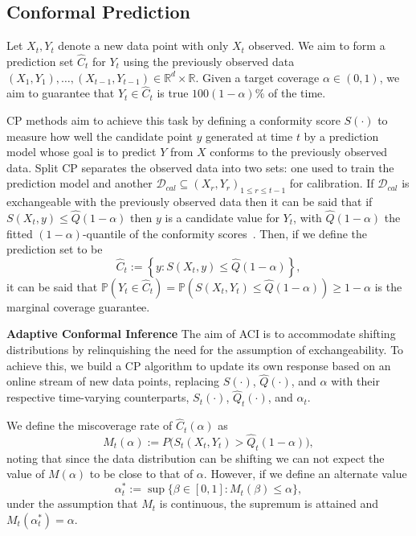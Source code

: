 \subsection{Conformal Prediction}
Let \(X_{t}, Y_{t}\) denote a new data point with only \(X_{t}\) observed. We aim to form a prediction set \(\hat{C}_t\) for \(Y_t\) using the previously observed data \(
(X_1, Y_1), \ldots, (X_{t-1}, Y_{t-1}) \in \mathbb{R}^d \times \mathbb{R}
\). Given a target coverage \(\alpha \in (0,1)\), we aim to guarantee that \(Y_t \in \hat{C}_t\) is true \(100(1-\alpha)\%\) of the time. 

CP methods aim to achieve this task by defining a conformity score \(S(\cdot)\) to measure how well the candidate point \(y\) generated at time \(t\) by a prediction model whose goal is to predict \(Y\) from \(X\) conforms to the previously observed data.
Split CP separates the observed data into two sets: one used to train the prediction model and another \(\mathcal{D}_{cal} \subseteq {(X_r,Y_r)}_{1 \le r \le t-1}\) for calibration. If \(\mathcal{D}_{cal}\) is exchangeable with the previously observed data then it can be said that if \(S(X_t,y) \le \hat{Q}(1-\alpha)\) then \(y\) is a candidate value for \(Y_t\), with \(\hat{Q}(1-\alpha)\) the fitted \((1-\alpha)\)-quantile of the conformity scores~\cite{gibbs2024conformal}.
Then, if we define the prediction set to be 
\[\hat{C}_{t}:=\left\{y:S(X_t,y)\leq \hat{Q}(1-\alpha)\right\},\]
it can be said that
\(
\mathbb{P}(Y_t \in \hat{C}_t) = \mathbb{P}(S(X_t, Y_t) \le \hat{Q}(1-\alpha)) \geq 1-\alpha
\) is the marginal coverage guarantee.

\textbf{Adaptive Conformal Inference} The aim of ACI is to accommodate shifting distributions by relinquishing the need for the assumption of exchangeability. To achieve this, we build a CP algorithm to update its own response based on an online stream of new data points, replacing \(S(\cdot)\), \(\hat{Q}(\cdot)\), and \(\alpha\) with their respective time-varying  counterparts, \(S_t(\cdot)\), \(\hat{Q}_t(\cdot)\), and \(\alpha_t\).

We define the miscoverage rate of \(\hat{C}_t(\alpha)\) as
\[M_t(\alpha):=P(S_t(X_t,Y_t)>\hat{Q}_t(1-\alpha)\big),\]
noting that since the data distribution can be shifting we can not expect the value of \(M(\alpha)\) to be close to that of \(\alpha\). However, if we define an alternate value
\[
\alpha_t^* := \sup\{\beta \in [0,1] : M_t(\beta) \le \alpha\},
\]
under the assumption that \(M_t\) is continuous, the supremum is attained and \(M_t(\alpha_t^*)=\alpha\).

